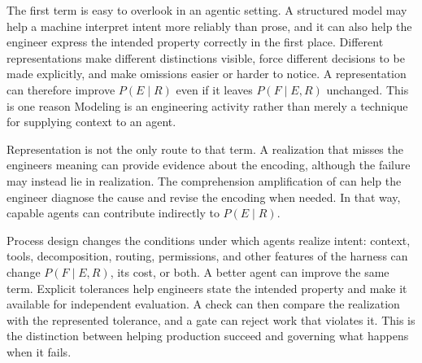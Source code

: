 
The first term is easy to overlook in an agentic setting. A structured model may help a machine interpret intent more reliably than prose, and it can also help the engineer express the intended property correctly in the first place. Different representations make different distinctions visible, force different decisions to be made explicitly, and make omissions easier or harder to notice. A representation can therefore improve \(P(E \mid R)\) even if it leaves \(P(F \mid E,R)\) unchanged. This is one reason Modeling is an engineering activity rather than merely a technique for supplying context to an agent.


Representation is not the only route to that term. A realization that misses the engineer\textquotesingle s meaning can provide evidence about the encoding, although the failure may instead lie in realization. The comprehension amplification of  can help the engineer diagnose the cause and revise the encoding when needed. In that way, capable agents can contribute indirectly to \(P(E \mid R)\).


Process design changes the conditions under which agents realize intent: context, tools, decomposition, routing, permissions, and other features of the harness can change \(P(F\mid E,R)\), its cost, or both. A better agent can improve the same term. Explicit tolerances help engineers state the intended property and make it available for independent evaluation. A check can then compare the realization with the represented tolerance, and a gate can reject work that violates it. This is the distinction between helping production succeed and governing what happens when it fails.

